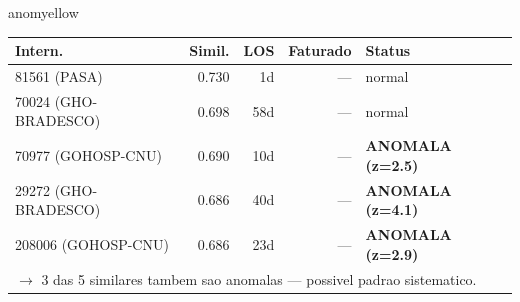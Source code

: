 \documentclass[a4paper,10pt]{article}
\begin{document}
\begin{anomalycard}[Internacao 165786 | GHO-PETROBRAS | MODERADO (z=2.42)]{anomyellow}
\begin{tabular}{l r r r l}\toprule\textbf{Intern.} & \textbf{Simil.} & \textbf{LOS} & \textbf{Faturado} & \textbf{Status} \\\midrule
81561 (PASA) & 0.730 & 1d & --- & \textcolor{jcubeblue}{normal} \\
70024 (GHO-BRADESCO) & 0.698 & 58d & --- & \textcolor{jcubeblue}{normal} \\
70977 (GOHOSP-CNU) & 0.690 & 10d & --- & \textcolor{anomred}{\textbf{ANOMALA (z=2.5)}} \\
29272 (GHO-BRADESCO) & 0.686 & 40d & --- & \textcolor{anomred}{\textbf{ANOMALA (z=4.1)}} \\
208006 (GOHOSP-CNU) & 0.686 & 23d & --- & \textcolor{anomred}{\textbf{ANOMALA (z=2.9)}} \\
\multicolumn{5}{l}{\textcolor{anomred}{\small $\rightarrow$ 3 das 5 similares tambem sao anomalas --- possivel padrao sistematico.}} \\
\bottomrule\end{tabular}


\end{anomalycard}

\newpage
\end{document}
